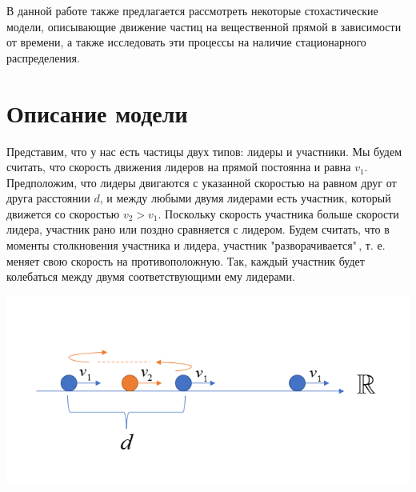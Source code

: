 \documentclass[12pt,a4paper]{article}
\begin{document}
В данной работе также предлагается рассмотреть некоторые стохастические модели, описывающие движение частиц на вещественной прямой в зависимости от времени, а также исследовать эти процессы на наличие стационарного распределения. 

\section{Описание модели}

Представим, что у нас есть частицы двух типов: лидеры и участники. Мы будем считать, что скорость движения лидеров на прямой постоянна и равна $v_1$. Предположим, что лидеры двигаются с указанной скоростью на равном друг от друга расстоянии $d$, и между любыми двумя лидерами есть участник, который движется со скоростью $v_2 > v_1$. Поскольку скорость участника больше скорости лидера, участник рано или поздно сравняется с лидером. Будем считать, что в моменты столкновения участника и лидера, участник "разворачивается"\,, т. е. меняет свою скорость на противоположную. Так, каждый участник будет колебаться между двумя соответствующими ему лидерами.
\begin{center}
    \includegraphics[scale=0.5]{на прямой.png}\\
\end{center}
\end{document}
